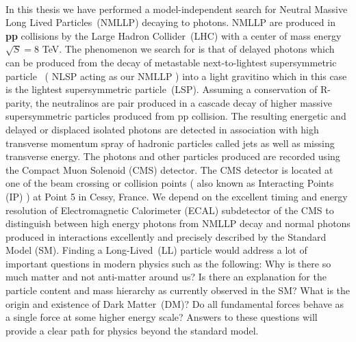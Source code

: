 \paragraph*{}
In this thesis we have performed a model-independent search for  Neutral Massive Long Lived Particles~(NMLLP) 
decaying to photons. NMLLP are produced in \textbf{pp} collisions by  the Large Hadron Collider~(LHC) 
with a center of mass energy  $\sqrt{S} = 8 $ TeV. 
The phenomenon we search for is that of delayed photons which can be produced from the decay of metastable next-to-lightest supersymmetric particle ~( NLSP acting as our NMLLP ) into a light gravitino which in this case is the lightest supersymmetric particle~(LSP). Assuming a conservation of R-parity, the neutralinos are pair produced in a cascade decay of higher massive  supersymmetric particles produced from pp collision. The resulting energetic and delayed or displaced isolated photons are detected in association with high transverse momentum spray of hadronic particles called jets as well as missing transverse energy. 
The photons and other particles produced are recorded using 
the Compact Muon Solenoid (CMS) detector.
The CMS detector is located at one of the beam crossing or collision points ( also known as Interacting Points (IP) ) at Point 5 in Cessy, France.
We depend on the excellent timing and energy resolution of Electromagnetic Calorimeter
(ECAL) subdetector of the CMS to distinguish between high energy photons from NMLLP decay and normal photons
produced in interactions excellently and precisely described by the Standard Model (SM). 
Finding a Long-Lived~(LL) particle would address a lot of important questions in modern physics such as the following:
Why is there so much matter and not anti-matter around us?
Is there an explanation for the particle content and mass hierarchy as currently observed in the SM? 
What is the origin and existence of Dark Matter~(DM)?  
Do all fundamental forces behave as a single force at some higher energy scale?
Answers to these questions will provide a clear path for physics beyond the standard model.
